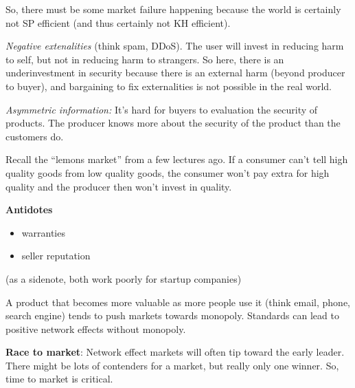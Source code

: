 So, there must be some market failure happening because the world is certainly not SP efficient (and thus certainly not KH efficient).

\textit{Negative extenalities} (think spam, DDoS). The user will invest in reducing harm to self, but not in reducing harm to strangers. So here, there is an underinvestment in security because there is an external harm (beyond producer to buyer), and bargaining to fix externalities is not possible in the real world.

\textit{Asymmetric information:} It's hard for buyers to evaluation the security of products. The producer knows more about the security of the product than the customers do.

Recall the ``lemons market'' from a few lectures ago. If a consumer can't tell high quality goods from low quality goods, the consumer won't pay extra for high quality and the producer then won't invest in quality. 

\textbf{Antidotes} 
\begin{itemize}
	\item warranties
	\item seller reputation
\end{itemize}
(as a sidenote, both work poorly for startup companies)

A product that becomes more valuable as more people use it (think email, phone, search engine) tends to push markets towards monopoly. Standards can lead to positive network effects without monopoly. 



\textbf{Race to market}: Network effect markets will often tip toward the early leader. There might be lots of contenders for a market, but really only one winner. So, time to market is critical. 

